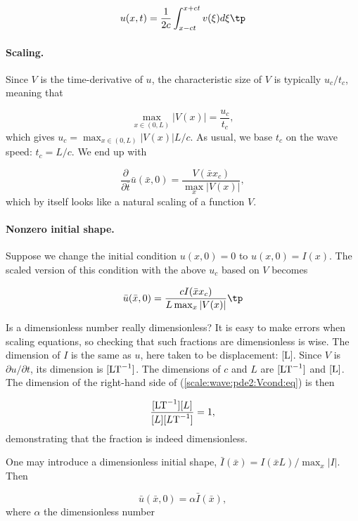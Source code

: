 \documentclass[graybox,envcountchap,sectrefs,final]{svmonodo}
\newenvironment{notice_mdfboxadmon}[1][]{
\begin{notice_mdfboxmdframed}[frametitle=#1]
}
{
\end{notice_mdfboxmdframed}
}
\begin{document}
\[ u(x,t) = \frac{1}{2c}\int_{x-ct}^{x+ct} v(\xi) d\xi\tp\]

\paragraph{Scaling.}
Since $V$ is the time-derivative of $u$, the characteristic size of
$V$ is typically $u_c/t_c$, meaning that

\[ \max_{x\in(0,L)}|V(x)| = \frac{u_c}{t_c},\]
which gives $u_c = \max_{x\in(0,L)}|V(x)| L/c$. As usual, we base $t_c$
on the wave speed: $t_c = L/c$. We end up with

\[ \frac{\partial}{\partial \bar t} \bar u(\bar x,0) =
\frac{V(\bar x x_c)}{\max_x |V(x)|},
\]
which by itself looks like a natural scaling of a function $V$.

\paragraph{Nonzero initial shape.}
Suppose we change the initial condition $u(x,0)=0$ to $u(x,0)=I(x)$.
The scaled version of this condition with the above $u_c$
based on $V$ becomes

\begin{equation}
\bar u(\bar x, 0) = \frac{cI(\bar x x_c)}{L\max_x |V(x)|}\tp
\label{scale:wave:pde2:Vcond:eq}
\end{equation}


\begin{notice_mdfboxadmon}
Is a dimensionless number really dimensionless?
It is easy to make errors when scaling equations, so checking that
such fractions are dimensionless is wise.
The dimension of $I$ is the same as $u$, here taken to be displacement:
[L].
Since $V$ is $\partial u/\partial t$, its dimension is
$[\hbox{LT}^{-1}]$. The dimensions of $c$ and $L$ are
$[\hbox{LT}^{-1}]$ and $[\hbox{L}]$. The dimension of the right-hand side
of (\ref{scale:wave:pde2:Vcond:eq}) is then

\[ \frac{[\hbox{LT}^{-1}][L]}{[L][L\hbox{T}^{-1}]}
= 1,\]
demonstrating that the fraction is indeed dimensionless.
\end{notice_mdfboxadmon}



One may introduce a dimensionless initial
shape, $\bar I (\bar x)= I(\bar xL)/\max_x |I|$. Then

\[ \bar u(\bar x, 0) = \alpha\bar I(\bar x),\]
where $\alpha$ the dimensionless number
\end{document}

